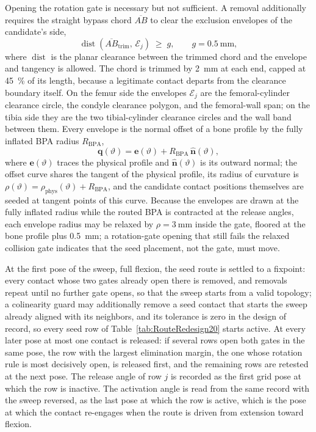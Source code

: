\documentclass[utf8]{frontiers_suppmat} %
\begin{document}
Opening the rotation gate is necessary but not sufficient. A removal additionally requires the straight bypass chord $\overline{AB}$ to clear the exclusion envelopes of the candidate's side,
\begin{equation}
\operatorname{dist}\!\left(\overline{AB}_{\mathrm{trim}},\, \mathcal{E}_{j}\right) \;\geq\; g, \qquad g = \qty{0.5}{\mm},
\label{eq:app_bypass_gate}
\end{equation}
where $\operatorname{dist}$ is the planar clearance between the trimmed chord and the envelope and tangency is allowed. The chord is trimmed by \qty{2}{\mm} at each end, capped at \qty{45}{\percent} of its length, because a legitimate contact departs from the clearance boundary itself. On the femur side the envelopes $\mathcal{E}_{j}$ are the femoral-cylinder clearance circle, the condyle clearance polygon, and the femoral-wall span; on the tibia side they are the two tibial-cylinder clearance circles and the wall band between them. Every envelope is the normal offset of a bone profile by the fully inflated BPA radius $R_{\mathrm{BPA}}$,
\begin{equation}
\mathbf{q}(\vartheta) = \mathbf{e}(\vartheta) + R_{\mathrm{BPA}}\,\hat{\mathbf{n}}(\vartheta),
\label{eq:app_offset_curve}
\end{equation}
where $\mathbf{e}(\vartheta)$ traces the physical profile and $\hat{\mathbf{n}}(\vartheta)$ is its outward normal; the offset curve shares the tangent of the physical profile, its radius of curvature is $\rho(\vartheta) = \rho_{\mathrm{phys}}(\vartheta) + R_{\mathrm{BPA}}$, and the candidate contact positions themselves are seeded at tangent points of this curve. Because the envelopes are drawn at the fully inflated radius while the routed BPA is contracted at the release angles, each envelope radius may be relaxed by $\rho = \qty{3}{\mm}$ inside the gate, floored at the bone profile plus \qty{0.5}{\mm}; a rotation-gate opening that still fails the relaxed collision gate indicates that the seed placement, not the gate, must move.

At the first pose of the sweep, full flexion, the seed route is settled to a fixpoint: every contact whose two gates already open there is removed, and removals repeat until no further gate opens, so that the sweep starts from a valid topology; a colinearity guard may additionally remove a seed contact that starts the sweep already aligned with its neighbors, and its tolerance is zero in the design of record, so every seed row of Table~\ref{tab:RouteRedesign20} starts active. At every later pose at most one contact is released: if several rows open both gates in the same pose, the row with the largest elimination margin, the one whose rotation rule is most decisively open, is released first, and the remaining rows are retested at the next pose. The release angle of row $j$ is recorded as the first grid pose at which the row is inactive. The activation angle is read from the same record with the sweep reversed, as the last pose at which the row is active, which is the pose at which the contact re-engages when the route is driven from extension toward flexion.
\end{document}
